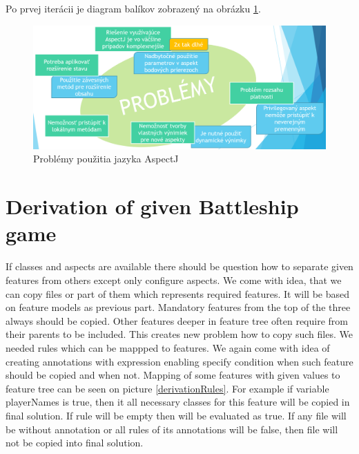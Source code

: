\documentclass[11pt,slovak,a4paper,twoside]{article}
\begin{document}
Po prvej iterácii je diagram balíkov zobrazený na obrázku \ref{problemsOfAspectJ}.

\begin{figure}[H]  %
					\begin{center}
									\includegraphics[width=\linewidth]{fig/problemsOfAspectJ.png}
									\caption{Problémy použitia jazyka AspectJ}
									\label{problemsOfAspectJ}
					\end{center}
\end{figure}



\section{Derivation of given Battleship game} \label{layersSection}

If classes and aspects are available there should be question how to separate given features from others except only configure aspects.
We come with idea, that we can copy files or part of them which represents required features. It will be based on feature models as previous part. Mandatory features from the top of the three always should be copied. Other features deeper in feature tree often require from their parents to be included. This creates new problem how to copy such files. We needed rules which can be mappped to features. We again come with idea of creating annotations with expression enabling specify condition when such feature should be copied and when not. Mapping of some features with given values to feature tree can be seen on picture \ref{derivationRules}. For example if variable playerNames is true, then it all necessary classes for this feature will be copied in final solution. If rule will be empty then will be evaluated as true. If any  file will be without annotation or all rules of its annotations will be false, then file will not be copied into final solution.
\end{document}
